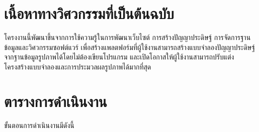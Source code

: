 \documentclass[12pt,oneside,openright,a4paper]{cpe-thai-project}
\begin{document}
\section{เนื้อหาทางวิศวกรรมที่เป็นต้นฉบับ}
\hspace{2em}โครงงานนี้พัฒนาขึ้นจากการใช้ความรู้ในการพัฒนาเว็บไซต์ การสร้างปัญญาประดิษฐ์ การจัดการฐานข้อมูลและวิศวกรรมซอฟต์แวร์ เพื่อสร้างแพลตฟอร์มที่ผู้ใช้งานสามารถสร้างแบบจำลองปัญญาประดิษฐ์จากฐานข้อมูลรูปภาพได้โดยไม่ต้องเขียนโปรแกรม และเปิดโอกาสให้ผู้ใช้งานสามารถปรับแต่งโครงสร้างแบบจำลองและการประมวลผลรูปภาพได้มากที่สุด

\section{ตารางการดําเนินงาน}
\vskip4pt
\hspace{2em}ขั้นตอนการดําเนินงานมีดังนี้
\end{document}
